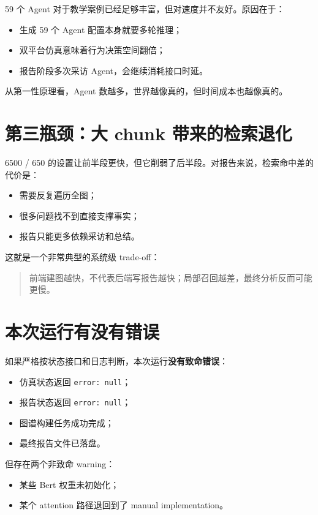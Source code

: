 \documentclass[UTF8,10pt,oneside]{ctexbook}
\newcommand{\code}[1]{\nolinkurl{#1}}
\begin{document}
59 个 Agent 对于教学案例已经足够丰富，但对速度并不友好。原因在于：

\begin{itemize}
  \item 生成 59 个 Agent 配置本身就要多轮推理；
  \item 双平台仿真意味着行为决策空间翻倍；
  \item 报告阶段多次采访 Agent，会继续消耗接口时延。
\end{itemize}

从第一性原理看，Agent 数越多，世界越像真的，但时间成本也越像真的。

\section{第三瓶颈：大 chunk 带来的检索退化}

6500 / 650 的设置让前半段更快，但它削弱了后半段。对报告来说，检索命中差的代价是：

\begin{itemize}
  \item 需要反复遍历全图；
  \item 很多问题找不到直接支撑事实；
  \item 报告只能更多依赖采访和总结。
\end{itemize}

这就是一个非常典型的系统级 trade-off：

\begin{quote}
前端建图越快，不代表后端写报告越快；局部召回越差，最终分析反而可能更慢。
\end{quote}

\section{本次运行有没有错误}

如果严格按状态接口和日志判断，本次运行\textbf{没有致命错误}：

\begin{itemize}
  \item 仿真状态返回 \code{error: null}；
  \item 报告状态返回 \code{error: null}；
  \item 图谱构建任务成功完成；
  \item 最终报告文件已落盘。
\end{itemize}

但存在两个非致命 warning：

\begin{itemize}
  \item 某些 Bert 权重未初始化；
  \item 某个 attention 路径退回到了 manual implementation。
\end{itemize}
\end{document}
